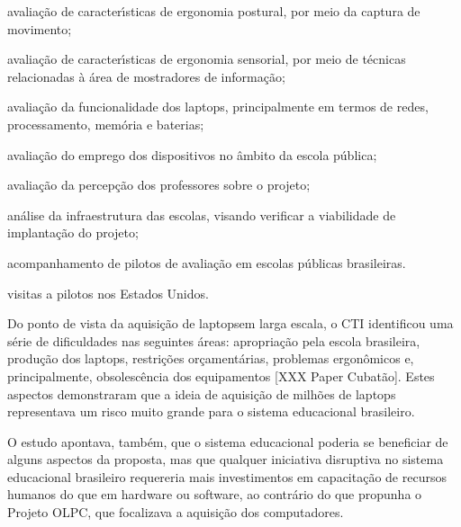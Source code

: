 \documentclass[
12pt,		%
openright,	%
twoside,  %
a4paper,			%
chapter=TITLE,		%
english,			%
french,				%
spanish,			%
brazil				%
]{USPSC-classe/USPSC}
\begin{document}
\begin{alineas}
\item avalia\c{c}\~ao de caracter\'{\i}sticas de ergonomia postural, por meio da captura de movimento;
\item avalia\c{c}\~ao de caracter\'{\i}sticas de ergonomia sensorial, por meio de t\'ecnicas relacionadas \`a \'area de mostradores de informa\c{c}\~ao;
\item avalia\c{c}\~ao da funcionalidade dos \textquotedbl laptops, principalmente em termos de redes, processamento, mem\'oria e baterias;
\item avalia\c{c}\~ao do emprego dos dispositivos no \^ambito da escola p\'ublica;
\item avalia\c{c}\~ao da percep\c{c}\~ao dos professores sobre o projeto;
\item an\'alise da infraestrutura das escolas, visando verificar a viabilidade de implanta\c{c}\~ao do projeto;
\item acompanhamento de pilotos de avalia\c{c}\~ao em escolas p\'ublicas brasileiras.
\item visitas a pilotos nos Estados Unidos.
\end{alineas}

Do ponto de vista da aquisi\c{c}\~ao de \textquotedbl laptops\textquotedbl  em larga escala, o CTI identificou uma s\'erie de dificuldades nas seguintes \'areas: apropria\c{c}\~ao pela escola brasileira, produ\c{c}\~ao dos laptops, restri\c{c}\~oes or\c{c}ament\'arias, problemas ergon\^omicos e, principalmente, obsolesc\^encia dos equipamentos [XXX Paper Cubat\~ao]. Estes aspectos demonstraram que a ideia de aquisi\c{c}\~ao de milh\~oes de laptops representava um risco muito grande para o sistema educacional brasileiro.














O estudo apontava, tamb\'em, que o sistema educacional poderia se beneficiar de alguns aspectos da proposta, mas que qualquer iniciativa disruptiva no sistema educacional brasileiro requereria mais investimentos em capacita\c{c}\~ao de recursos humanos do que em hardware ou software, ao contr\'ario do que propunha o Projeto OLPC, que focalizava a aquisi\c{c}\~ao dos computadores.
\end{document}
